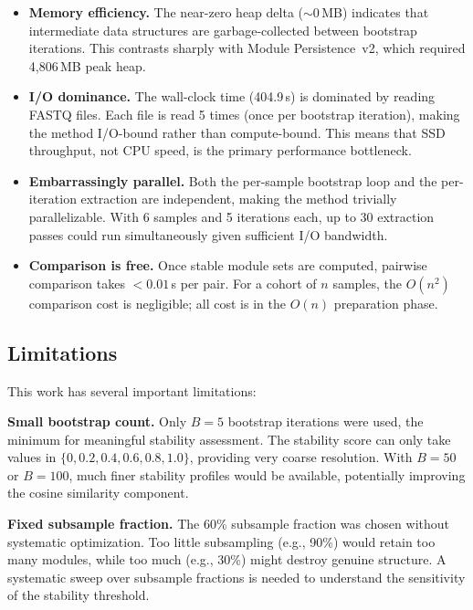 \documentclass{../yalumba}
\begin{document}
\begin{itemize}
  \item \textbf{Memory efficiency.}  The near-zero heap delta ($\sim$0\,MB)
    indicates that intermediate data structures are garbage-collected between
    bootstrap iterations.  This contrasts sharply with Module Persistence~v2,
    which required 4{,}806\,MB peak heap.
  \item \textbf{I/O dominance.}  The wall-clock time (404.9\,s) is dominated
    by reading FASTQ files.  Each file is read 5 times (once per bootstrap
    iteration), making the method I/O-bound rather than compute-bound.
    This means that SSD throughput, not CPU speed, is the primary performance
    bottleneck.
  \item \textbf{Embarrassingly parallel.}  Both the per-sample bootstrap
    loop and the per-iteration extraction are independent, making the method
    trivially parallelizable.  With 6 samples and 5 iterations each, up to
    30 extraction passes could run simultaneously given sufficient I/O
    bandwidth.
  \item \textbf{Comparison is free.}  Once stable module sets are computed,
    pairwise comparison takes $<0.01$\,s per pair.  For a cohort of $n$
    samples, the $O(n^2)$ comparison cost is negligible; all cost is in the
    $O(n)$ preparation phase.
\end{itemize}

\subsection{Limitations}

This work has several important limitations:

\begin{limitation}
\textbf{Small bootstrap count.}  Only $B = 5$ bootstrap iterations were used,
the minimum for meaningful stability assessment.  The stability score can only
take values in $\{0, 0.2, 0.4, 0.6, 0.8, 1.0\}$, providing very coarse
resolution.  With $B = 50$ or $B = 100$, much finer stability profiles would
be available, potentially improving the cosine similarity component.
\end{limitation}

\begin{limitation}
\textbf{Fixed subsample fraction.}  The 60\% subsample fraction was chosen
without systematic optimization.  Too little subsampling (e.g., 90\%) would
retain too many modules, while too much (e.g., 30\%) might destroy genuine
structure.  A systematic sweep over subsample fractions is needed to understand
the sensitivity of the stability threshold.
\end{limitation}
\end{document}
